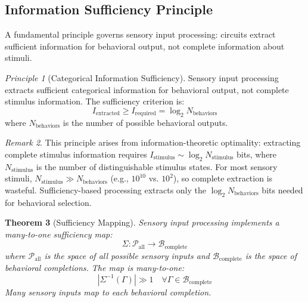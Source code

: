 \documentclass[aps,prd,twocolumn,superscriptaddress,floatfix,nofootinbib]{revtex4-2}
\newtheorem{theorem}{Theorem}[section]
\theoremstyle{remark}
\newtheorem{remark}[theorem]{Remark}
\newtheorem{principle}[theorem]{Principle}
\begin{document}
\subsection{Information Sufficiency Principle}

A fundamental principle governs sensory input processing: circuits extract sufficient information for behavioral output, not complete information about stimuli.

\begin{principle}[Categorical Information Sufficiency]
\label{princ:sufficiency}
Sensory input processing extracts sufficient categorical information for behavioral output, not complete stimulus information. The sufficiency criterion is:
\begin{equation}
I_{\text{extracted}} \geq I_{\text{required}} = \log_2 N_{\text{behaviors}}
\end{equation}
where $N_{\text{behaviors}}$ is the number of possible behavioral outputs.
\end{principle}

\begin{remark}
This principle arises from information-theoretic optimality: extracting complete stimulus information requires $I_{\text{stimulus}} \sim \log_2 N_{\text{stimulus}}$ bits, where $N_{\text{stimulus}}$ is the number of distinguishable stimulus states. For most sensory stimuli, $N_{\text{stimulus}} \gg N_{\text{behaviors}}$ (e.g., $10^{10}$ vs. $10^2$), so complete extraction is wasteful. Sufficiency-based processing extracts only the $\log_2 N_{\text{behaviors}}$ bits needed for behavioral selection.
\end{remark}

\begin{theorem}[Sufficiency Mapping]
\label{thm:sufficiency_map}
Sensory input processing implements a many-to-one sufficiency map:
\begin{equation}
\Sigma: \mathcal{P}_{\text{all}} \to \mathcal{B}_{\text{complete}}
\end{equation}
where $\mathcal{P}_{\text{all}}$ is the space of all possible sensory inputs and $\mathcal{B}_{\text{complete}}$ is the space of behavioral completions. The map is many-to-one:
\begin{equation}
|\Sigma^{-1}(\Gamma)| \gg 1 \quad \forall \Gamma \in \mathcal{B}_{\text{complete}}
\end{equation}
Many sensory inputs map to each behavioral completion.
\end{theorem}
\end{document}
